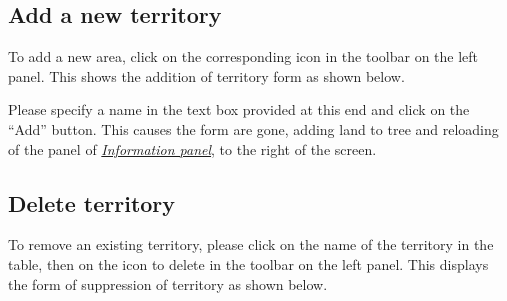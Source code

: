 \documentclass[letterpaper,10pt,english]{sphinxmanual}
\begin{document}
\subsection{Add a new territory}
\label{territories/territorieslist:ajouter-un-nouveau-territoire}
To add a new area, click on the corresponding icon in the toolbar on the left panel. This shows the addition of territory form as shown below.


Please specify a name in the text box provided at this end and click on the ``Add'' button. This causes the form are gone, adding land to tree and reloading of the panel of {\hyperref[territories/infopanel::doc]{\emph{\emph{Information panel}}}}, to the right of the screen.


\subsection{Delete territory}
\label{territories/territorieslist:supprimer-un-territoire}
To remove an existing territory, please click on the name of the territory in the table, then on the icon to delete in the toolbar on the left panel. This displays the form of suppression of territory as shown below.

\end{document}
